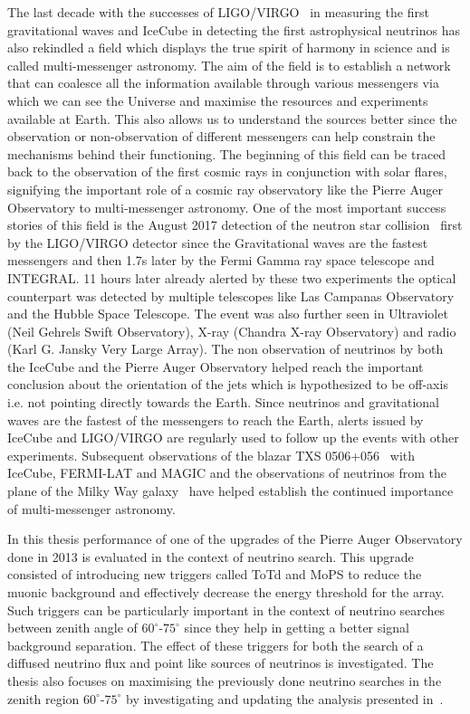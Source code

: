The last decade with the successes of LIGO/VIRGO~\cite{PhysRevLett.116.061102} in measuring the first gravitational waves and IceCube in detecting the first astrophysical neutrinos has also rekindled a field which displays the true spirit of harmony in science and is called multi-messenger astronomy. The aim of the field is to establish a network that can coalesce all the information available through various messengers via which we can see the Universe and maximise the resources and experiments available at Earth. This also allows us to understand the sources better since the observation or non-observation of different messengers can help constrain the mechanisms behind their functioning. The beginning of this field can be traced back to the observation of the first cosmic rays in conjunction with solar flares, signifying the important role of a cosmic ray observatory like the Pierre Auger Observatory to multi-messenger astronomy. One of the most important success stories of this field is the August 2017 detection of the neutron star collision~\cite{Abbott_2017} first by the LIGO/VIRGO detector since the Gravitational waves are the fastest messengers and then 1.7s later by the Fermi Gamma ray space telescope and INTEGRAL. 11 hours later already alerted by these two experiments the optical counterpart was detected by multiple telescopes like Las Campanas Observatory and the Hubble Space Telescope. The event was also further seen in Ultraviolet (Neil Gehrels Swift Observatory), X-ray (Chandra X-ray Observatory) and radio (Karl G. Jansky Very Large Array). The non observation of neutrinos by both the IceCube and the Pierre Auger Observatory helped reach the important conclusion about the orientation of the jets which is hypothesized to be off-axis i.e. not pointing directly towards the Earth. Since neutrinos and gravitational waves are the fastest of the messengers to reach the Earth, alerts issued by IceCube and LIGO/VIRGO are regularly used to follow up the events with other experiments. Subsequent observations of the blazar TXS 0506+056~\cite{TXS_Multi_2018} with IceCube, FERMI-LAT and MAGIC and the observations of neutrinos from the plane of the Milky Way galaxy~\cite{Galactic_plane_nu_2023} have helped establish the continued importance of multi-messenger astronomy.

In this thesis performance of one of the upgrades of the Pierre Auger Observatory done in 2013 is evaluated in the context of neutrino search. This upgrade consisted of introducing new triggers called \gls{ToTd} and \gls{MoPS} to reduce the muonic background and effectively decrease the energy threshold for the array. Such triggers can be particularly important in the context of neutrino searches between zenith angle of $60^\circ$-$75^\circ$ since they help in getting a better signal background separation. The effect of these triggers for both the search of a diffused neutrino flux and point like sources of neutrinos is investigated. The thesis also focuses on maximising the previously done neutrino searches in the zenith region $60^\circ$-$75^\circ$ by investigating and updating the analysis presented in~\cite{Aab_2019_diffuse, gap_note_2013}.

